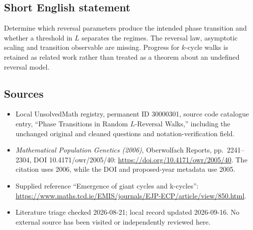 \documentclass[11pt]{article}
\begin{document}
\subsection{Short English statement}
Determine which reversal parameters produce the intended phase transition and whether a threshold in \(L\) separates the regimes. The reversal law, asymptotic scaling and transition observable are missing. Progress for \(k\)-cycle walks is retained as related work rather than treated as a theorem about an undefined reversal model.
\subsection{Sources}
\begin{itemize}
\item Local UnsolvedMath registry, permanent ID 30000301, source code catalogue entry, ``Phase Transitions in Random \(L\)-Reversal Walks,'' including the unchanged original and cleaned questions and notation-verification field.
\item \emph{Mathematical Population Genetics (2006)}, Oberwolfach Reports, pp.\ 2241--2304, DOI 10.4171/owr/2005/40: \url{https://doi.org/10.4171/owr/2005/40}. The citation uses 2006, while the DOI and proposed-year metadata use 2005.
\item Supplied reference ``Emergence of giant cycles and k-cycles'': \url{https://www.maths.tcd.ie/EMIS/journals/EJP-ECP/article/view/850.html}.
\item Literature triage checked 2026-08-21; local record updated 2026-09-16. No external source has been visited or independently reviewed here.
\end{itemize}
\end{document}
